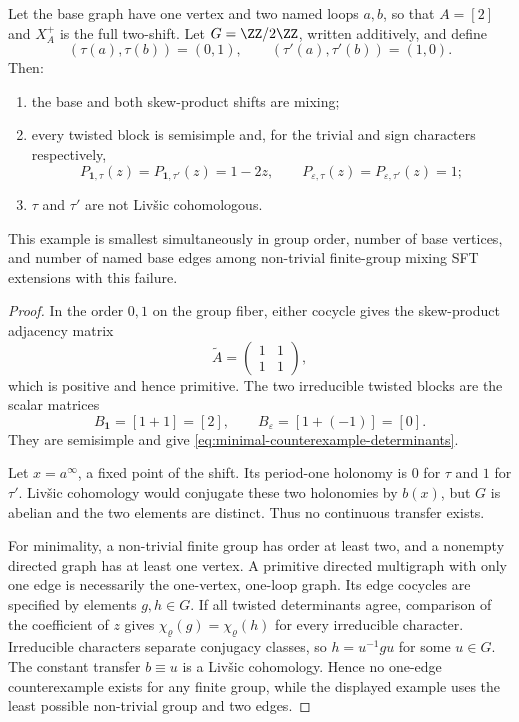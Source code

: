 \begin{proposition}
  \label{prop:minimal-twisted-determinant-counterexample}
  Let the base graph have one vertex and two named loops \(a,b\), so that
  \(A=[2]\) and \(X_A^+\) is the full two-shift.  Let
  \(G=\ZZ/2\ZZ\), written additively, and define
  \[
    (\tau(a),\tau(b))=(0,1),
    \qquad
    (\tau'(a),\tau'(b))=(1,0).
  \]
  Then:
  \begin{enumerate}[label=\textup{(\roman*)},leftmargin=*]
    \item the base and both skew-product shifts are mixing;
    \item every twisted block is semisimple and, for the trivial and sign
    characters respectively,
    \begin{equation}\label{eq:minimal-counterexample-determinants}
      P_{\mathbf1,\tau}(z)=P_{\mathbf1,\tau'}(z)=1-2z,
      \qquad
      P_{\varepsilon,\tau}(z)=P_{\varepsilon,\tau'}(z)=1;
    \end{equation}
    \item \(\tau\) and \(\tau'\) are not Liv\v{s}ic cohomologous.
  \end{enumerate}
  This example is smallest simultaneously in group order, number of base
  vertices, and number of named base edges among non-trivial finite-group
  mixing SFT extensions with this failure.
\end{proposition}

\begin{proof}
  In the order \(0,1\) on the group fiber, either cocycle gives the
  skew-product adjacency matrix
  \[
    \widetilde A=
    \begin{pmatrix}1&1\\1&1\end{pmatrix},
  \]
  which is positive and hence primitive.  The two irreducible twisted blocks
  are the scalar matrices
  \[
    B_{\mathbf1}=[1+1]=[2],
    \qquad
    B_\varepsilon=[1+(-1)]=[0].
  \]
  They are semisimple and give \eqref{eq:minimal-counterexample-determinants}.

  Let \(x=a^\infty\), a fixed point of the shift.  Its period-one holonomy
  is \(0\) for \(\tau\) and \(1\) for \(\tau'\).  Liv\v{s}ic cohomology
  would conjugate these two holonomies by \(b(x)\), but \(G\) is abelian and
  the two elements are distinct.  Thus no continuous transfer exists.

  For minimality, a non-trivial finite group has order at least two, and a
  nonempty directed graph has at least one vertex.  A primitive directed
  multigraph with only one edge is necessarily the one-vertex, one-loop
  graph.  Its edge cocycles are specified by elements \(g,h\in G\).  If all
  twisted determinants agree, comparison of the coefficient of \(z\) gives
  \(\chi_\varrho(g)=\chi_\varrho(h)\) for every irreducible character.
  Irreducible characters separate conjugacy classes, so \(h=u^{-1}gu\) for
  some \(u\in G\).  The constant transfer \(b\equiv u\) is a Liv\v{s}ic
  cohomology.  Hence no one-edge counterexample exists for any finite group,
  while the displayed example uses the least possible non-trivial group and
  two edges.
\end{proof}

